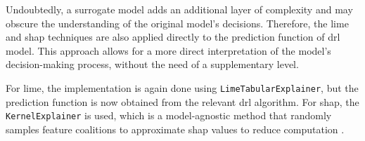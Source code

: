 Undoubtedly, a surrogate model adds an additional layer of complexity and may obscure the understanding of the original model's decisions. Therefore, the \acrshort{lime} and \acrshort{shap} techniques are also applied directly to the prediction function of \acrshort{drl} model. This approach allows for a more direct interpretation of the model's decision-making process, without the need of a supplementary level. 

For \acrshort{lime}, the implementation is again done using \texttt{LimeTabularExplainer}, but the prediction function is now obtained from the relevant \acrshort{drl} algorithm. For \acrshort{shap}, the \texttt{KernelExplainer} is used, which is a model-agnostic method that randomly samples feature coalitions to approximate \acrshort{shap} values to reduce computation \cite{ShapKernelExplainer}.
